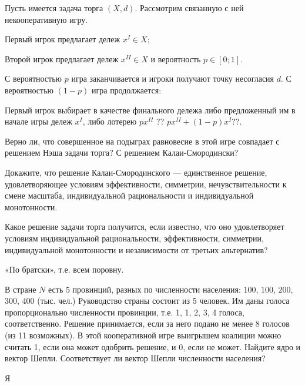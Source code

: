 \begin{problem}
 Пусть имеется задача торга $(X,d).$ Рассмотрим связанную
с ней некооперативную игру.

Первый игрок предлагает дележ $x^{I}\in X$;

Второй игрок предлагает дележ $x^{II}\in X$ и вероятность $p\in[0;1]$.

С вероятностью $p$ игра заканчивается и игроки получают точку несогласия
$d$. С вероятностью $(1-p)$ игра продолжается:

Первый игрок выбирает в качестве финального дележа либо предложенный
им в начале игры дележ $x^{I}$, либо лотерею $px^{II}$ {\red ?? $px^{II}+(1-p)x^{I}$??}.

Верно ли, что совершенное на подыграх равновесие в этой игре совпадает
с решением Нэша задачи торга? С решением Калаи-Смородински?



\begin{sol}

\end{sol}
\end{problem}



\begin{problem}
Докажите, что решение Калаи-Смородинского — единственное
решение, удовлетворяющее условиям эффективности, симметрии, нечувствительности
к смене масштаба, индивидуальной рациональности и индивидуальной монотонности.



\begin{sol}

\end{sol}
\end{problem}



\begin{problem}
Какое решение задачи торга получится, если известно, что оно удовлетворяет
условиям индивидуальной рациональности, эффективности, симметрии,
индивидуальной монотонности и независимости от третьих альтернатив?



\begin{sol}
«По братски», т.е. всем поровну.
\end{sol}
\end{problem}

\begin{problem}
В стране $N$ есть $5$ провинций, разных по численности населения: $100$, $100$, $200$, $300$, $400$ (тыс. чел.) Руководство страны состоит из 5 человек. Им даны голоса пропорционально
численности провинции, т.е. 1, 1, 2, 3, 4 голоса, соответственно. Решение принимается,
если за него подано не менее 8 голосов (из 11 возможных). В этой кооперативной игре
выигрышем коалиции можно считать 1, если она может одобрить решение, и 0, если не
может. Найдите ядро и вектор Шепли. Соответствует ли вектор Шепли численности населения?

\begin{sol}
Я\end{sol}


\end{problem}

